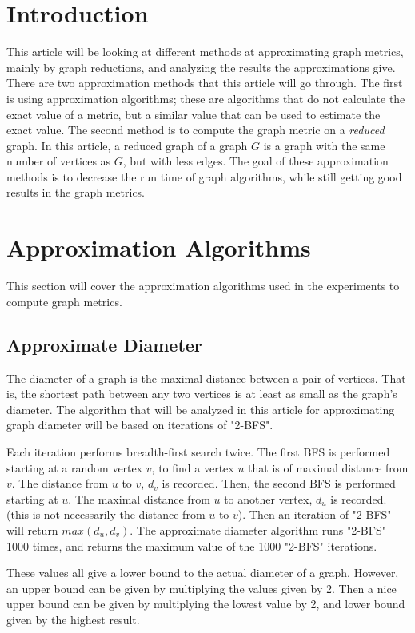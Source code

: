 \documentclass[11pt]{article}
\begin{document}
\section{Introduction}
This article will be looking at different methods at approximating graph metrics, mainly by graph reductions, and analyzing the results the approximations give.  There are two approximation methods that this article will go through.  The first is using approximation algorithms; these are algorithms that do not calculate the exact value of a metric, but a similar value that can be used to estimate the exact value.  The second method is to compute the graph metric on a \textit{reduced} graph. In this article, a reduced graph of a graph $G$ is a graph with the same number of vertices as $G$, but with less edges.  The goal of these approximation methods is to decrease the run time of graph algorithms, while still getting good results in the graph metrics.

\section{Approximation Algorithms}
This section will cover the approximation algorithms used in the experiments to compute graph metrics.
\subsection{Approximate Diameter} 
The diameter of a graph is the maximal distance between a pair of vertices.  That is, the shortest path between any two vertices is at least as small as the graph's diameter.  The algorithm that will be analyzed in this article for approximating graph diameter will be based on iterations of "2-BFS".  

Each iteration performs breadth-first search twice.  The first BFS is performed starting at a random vertex $v$, to find a vertex $u$ that is of maximal distance from $v$.  The distance from $u$ to $v$, $d_v$ is recorded.  Then, the second BFS is performed starting at $u$.  The maximal distance from $u$ to another vertex, $d_u$ is recorded. (this is not necessarily the distance from $u$ to $v$).  Then an iteration of "2-BFS" will return $max(d_u, d_v)$.  The approximate diameter algorithm runs "2-BFS" 1000 times, and returns the maximum value of the 1000 "2-BFS" iterations.

These values all give a lower bound to the actual diameter of a graph.  However, an upper bound can be given by multiplying the values given by 2.  Then a nice upper bound can be given by multiplying the lowest value by 2, and lower bound given by the highest result.
\end{document}
